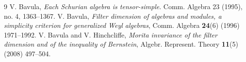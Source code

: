 \documentclass[12pt, a4paper]{amsart}
\begin{document}
\begin{thebibliography}{9}
 {\sc V. Bavula},
{\em Each Schurian algebra is tensor-simple}. Comm. Algebra 23 (1995), no. 4, 1363–1367.
{\sc V. Bavula},
{\em Filter dimension of algebras and modules, a simplicity criterion for generalized Weyl algebras},
Comm. Algebra {\bf 24}(6) (1996) 1971--1992.
{\sc V. Bavula and V. Hinchcliffe},
{\em Morita invariance of the filter dimension and of the inequality of Bernstein},
Algebr. Represent. Theory {\bf 11}(5) (2008) 497–504.

\end{thebibliography}
\end{document}
